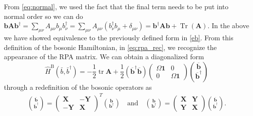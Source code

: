From \ref{eq:normal}, we used the fact that the final term needs to be put into normal order so we can do $\bm{b} \bm{A} \bm{b}^{\dagger}=\sum_{\mu\nu}A_{\mu\nu}b_\mu b_\nu^{\dagger}= \sum_{\mu\nu}A_{\mu\nu}\left(b_\nu^\dagger b_\mu + \delta_{\mu\nu}\right) = \bm{b}^\dagger \bm{A} \bm{b} + \operatorname{Tr}\left(\bm{A}\right)$. In the above we have showed equivalence to the previously defined form in \ref{eb}.  From this definition of the bosonic Hamiltonian, in \ref{eq:rpa_rec}, we recognize the appearance of the RPA matrix. We can obtain a diagonalized form 
\begin{equation}
\hat{H}^{\mathrm{B}}\left(\bar{b}, \bar{b}^{\dagger}\right)=-\frac{1}{2} \operatorname{tr} \mathbf{A}+\frac{1}{2}\left(\overline{\mathbf{b}}^{\dagger} \overline{\mathbf{b}}\right)\left(\begin{array}{cc}
\Omega \mathbf{1} & 0 \\
0 & \Omega \mathbf{1}
\end{array}\right)\binom{\overline{\mathbf{b}}}{\overline{\mathbf{b}}^{\dagger}}
\end{equation}
through a redefinition of the bosonic operators as
\begin{align}
\binom{\overline{\mathbf{b}}}{\overline{\mathbf{b}}^{\dagger}}=\left(\begin{array}{cc}
\mathbf{X} & -\mathbf{Y} \\
-\mathbf{Y} & \mathbf{X}
\end{array}\right)^T\binom{\mathbf{b}}{\mathbf{b}^{\dagger}} \quad \text{and} \quad
\binom{\mathbf{b}}{\mathbf{b}^{\dagger}}=\left(\begin{array}{ll}
\mathbf{X} & \mathbf{Y} \\
\mathbf{Y} & \mathbf{X}
\end{array}\right)\binom{\overline{\mathbf{b}}}{\overline{\mathbf{b}}^{\dagger}} .
\end{align}

